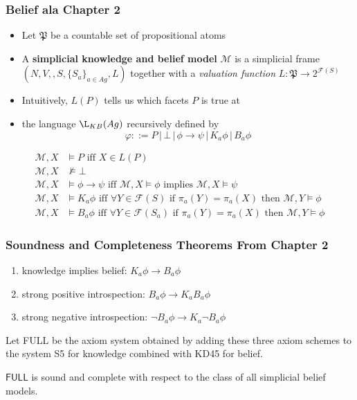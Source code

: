 \documentclass{beamer}
\newcommand{\M}{\mathcal{M}}
\newcommand{\F}{\mathcal{F}}
\begin{document}
\begin{frame}[fragile]
	\frametitle{Belief ala Chapter 2}
	\begin{itemize}
		\item Let $\mathfrak{P}$ be a countable set of propositional atoms
		\item A \textbf{simplicial knowledge and belief model} $\M$ is a simplicial frame $(N,V,,S,\{S_{a}\}_{a \in Ag},L)$ together with a \emph{valuation function} $L: \mathfrak{P} \to 2^{\F(S)}$
		\item Intuitively, $L(P)$ tells us which facets $P$ is true at
		\item the language $\L_{KB}(Ag)$ recursively defined by
		$$\varphi ::= P \, | \, \bot \, | \, \phi \rightarrow \psi \, | \, K_{a}\phi\, | \, B_{a}\phi$$
	\end{itemize}
	
	\begin{align*}
		\M,X & \models P \text{ iff } X \in L(P)\\
		\M,X & \nvDash \bot\\
		\M,X & \models \phi \rightarrow \psi \text{ iff } \M,X \models \phi \text{ implies } \M,X \models \psi\\
		\M,X & \models K_a \phi \text{ iff } \forall Y \in \F(S) \text{ if } \pi_a(Y) = \pi_a(X) \text{ then } \M,Y \models \phi\\
		\M,X & \models B_a \phi \text{ iff } \forall Y \in \F(S_a) \text{ if } \pi_a(Y) = \pi_a(X) \text{ then } \M,Y \models \phi
	\end{align*}
\end{frame}

\begin{frame}[fragile]
	\frametitle{Soundness and Completeness Theorems From Chapter 2}
	\begin{enumerate}
		\item knowledge implies belief: $K_{a} \phi \rightarrow B_{a} \phi$
		\item strong positive introspection: $B_{a} \phi \rightarrow K_{a} B_{a} \phi$
		\item strong negative introspection: $\lnot B_{a} \phi \rightarrow K_{a} \lnot B_{a} \phi$
	\end{enumerate}
	
	Let \textsf{FULL} be the axiom system obtained by adding these three axiom schemes to the system \textsf{S5} for knowledge combined with \textsf{KD45} for belief.
	\begin{theorem}
		$\textsf{FULL}$ is sound and complete with respect to the class of all simplicial belief models.
	\end{theorem}
	
\end{frame}
\end{document}
